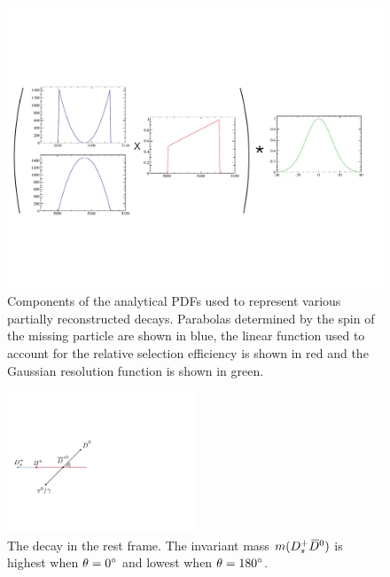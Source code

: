 \begin{figure}[!h]
    \centering
    \includegraphics[width=1.0\textwidth]{figs/B2DsKK/partreco_diagram.pdf}
    \caption{Components of the analytical PDFs used to represent various partially reconstructed  decays. Parabolas determined by the spin of the missing particle are shown in blue, the linear function used to account for the relative selection efficiency is shown in red and the Gaussian resolution function is shown in green.} 
    \label{fig:B2DsKK_partreco_diagram}   
\end{figure}

\begin{figure}[!h]
    \centering
    \includegraphics[width=0.5\textwidth]{figs/B2DsKK/partreco_decay.pdf}
    \caption{The \decay{\Bp}{\Dsp(\decay{\Dstarzb}{\Dzb \piz/\Pgamma})} decay in the \Dstarzb rest frame. The invariant mass $m({{D}^+_{s}}{{\kern 0.2em\overline{\kern -0.2em D}{}}{}^0})$ is highest when $\theta = 0^{\circ}$ and lowest when $\theta = 180^{\circ}$.} 
    \label{fig:B2DsKK_partreco_decay}   
\end{figure}


